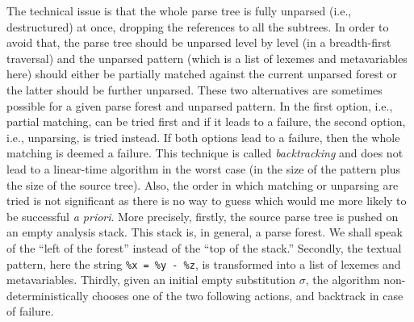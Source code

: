 The technical issue is that the whole parse tree is fully unparsed
(i.e., de\-structured) at once, dropping the references to all the
subtrees. In order to avoid that, the parse tree should be unparsed
level by level (in a breadth\hyp{}first traversal) and the unparsed
pattern (which is a list of lexemes and meta\-variables here) should
either be partially matched against the current unparsed forest or the
latter should be further unparsed. These two alternatives are
sometimes possible for a given parse forest and unparsed pattern. In
the first option, i.e., partial matching, can be tried first and if it
leads to a failure, the second option, i.e., unparsing, is tried
instead. If both options lead to a failure, then the whole matching is
deemed a failure. This technique is called \emph{backtracking} and
does not lead to a linear\hyp{}time algorithm in the worst case (in
the size of the pattern plus the size of the source tree). Also, the
order in which matching or unparsing are tried is not significant as
there is no way to guess which would me more likely to be successful
\emph{a priori}. More precisely, firstly, the source parse tree is
pushed on an empty analysis stack. This stack is, in general, a parse
forest. We shall speak of the ``left of the forest'' instead of the
``top of the stack.'' Secondly, the textual pattern, here the string
\texttt{\%x = \%y - \%z}, is transformed into a list of lexemes and
meta\-variables.
Thirdly, given an initial empty substitution \(\sigma\), the algorithm
non\hyp{}deterministically chooses one of the two following actions,
and backtrack in case of failure.
